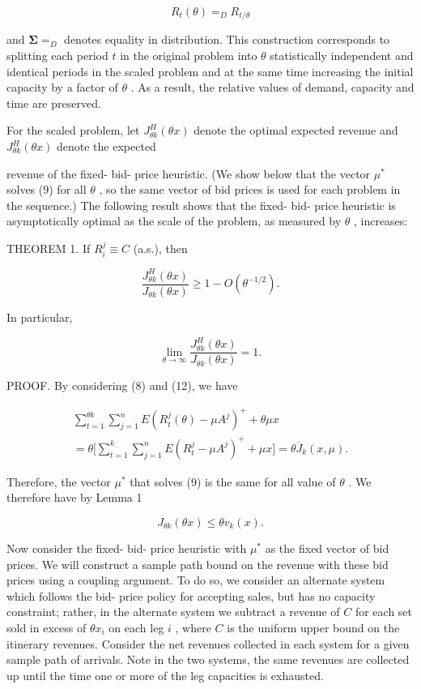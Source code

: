 \[
R_{t}(\theta) = _{D}R_{t / \theta} \tag{12}
\]

and \(\mathbf{\Sigma} = _{D}\) denotes equality in distribution. This
construction corresponds to splitting each period \(t\) in the original
problem into \(\theta\) statistically independent and identical periods
in the scaled problem and at the same time increasing the initial
capacity by a factor of \(\theta\) . As a result, the relative values of
demand, capacity and time are preserved.

For the scaled problem, let \(J_{\theta k}^{H}(\theta x)\) denote the
optimal expected revenue and \(J_{\theta k}^{H}(\theta x)\) denote the
expected

revenue of the fixed- bid- price heuristic. (We show below that the
vector \(\mu^{*}\) solves (9) for all \(\theta\) , so the same vector of
bid prices is used for each problem in the sequence.) The following
result shows that the fixed- bid- price heuristic is asymptotically
optimal as the scale of the problem, as measured by \(\theta\) ,
increases:

THEOREM 1. If \(R_{i}^{j} \equiv C\) (a.s.), then

\[
\frac{J_{\theta k}^{H}(\theta x)}{J_{\theta k}(\theta x)} \geq 1 - O(\theta^{-1 / 2}).
\]

In particular,

\[
\lim_{\theta \to \infty} \frac{J_{\theta k}^{H}(\theta x)}{J_{\theta k}(\theta x)} = 1.
\]

PROOF. By considering (8) and (12), we have

\[
\begin{array}{l}{{\sum_{t=1}^{\theta k}\sum_{j=1}^{n}E(R_{t}^{j}(\theta)-\mu A^{j})^{+}+\theta\mu x}}\\ {{=\theta\bigg[\sum_{t=1}^{k}\sum_{j=1}^{n}E(R_{t}^{j}-\mu A^{j})^{+}+\mu x\bigg]=\theta\overline{{J}}_{k}(x,\mu).}}\end{array} \tag{14}
\]

Therefore, the vector \(\mu^{*}\) that solves (9) is the same for all
value of \(\theta\) . We therefore have by Lemma 1

\[
J_{\theta k}(\theta x) \leq \theta v_{k}(x). \tag{13}
\]

Now consider the fixed- bid- price heuristic with \(\mu^{*}\) as the
fixed vector of bid prices. We will construct a sample path bound on the
revenue with these bid prices using a coupling argument. To do so, we
consider an alternate system which follows the bid- price policy for
accepting sales, but has no capacity constraint; rather, in the
alternate system we subtract a revenue of \(C\) for each set sold in
excess of \(\theta x_{i}\) on each leg \(i\) , where \(C\) is the
uniform upper bound on the itinerary revenues. Consider the net revenues
collected in each system for a given sample path of arrivals. Note in
the two systems, the same revenues are collected up until the time one
or more of the leg capacities is exhausted.

